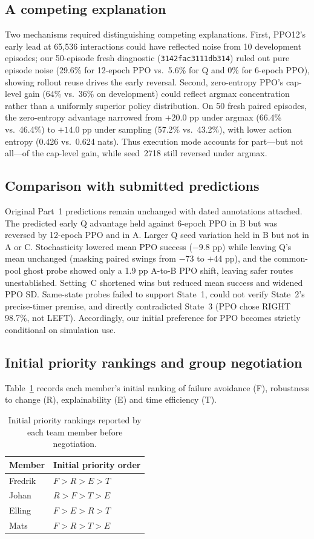 \subsection*{A competing explanation}
Two mechanisms required distinguishing competing explanations. First, PPO12's early lead at
65,536 interactions could have reflected noise from 10 development episodes; our 50-episode
fresh diagnostic (\texttt{3142fac3111db314}) ruled out pure episode noise (29.6\% for 12-epoch
PPO vs.\ 5.6\% for Q and 0\% for 6-epoch PPO), showing rollout reuse drives the early reversal.
Second, zero-entropy PPO's cap-level gain (64\% vs.\ 36\% on development) could reflect argmax
concentration rather than a uniformly superior policy distribution. On 50 fresh paired episodes,
the zero-entropy advantage narrowed from $+20.0$ pp under argmax (66.4\% vs.\ 46.4\%) to
$+14.0$ pp under sampling (57.2\% vs.\ 43.2\%), with lower action entropy (0.426 vs.\ 0.624 nats).
Thus execution mode accounts for part—but not all—of the cap-level gain, while seed~2718 still
reversed under argmax.

\subsection*{Comparison with submitted predictions}
Original Part~1 predictions remain unchanged with dated annotations attached. The predicted early
Q advantage held against 6-epoch PPO in B but was reversed by 12-epoch PPO and in A. Larger Q
seed variation held in B but not in A or C. Stochasticity lowered mean PPO success ($-9.8$ pp)
while leaving Q's mean unchanged (masking paired swings from $-73$ to $+44$ pp), and the common-pool
ghost probe showed only a 1.9 pp A-to-B PPO shift, leaving safer routes unestablished. Setting~C
shortened wins but reduced mean success and widened PPO SD. Same-state probes failed to support
State~1, could not verify State~2's precise-timer premise, and directly contradicted State~3
(PPO chose RIGHT 98.7\%, not LEFT). Accordingly, our initial preference for PPO becomes strictly
conditional on simulation use.

\subsection*{Initial priority rankings and group negotiation}
Table~\ref{tab:priorities} records each member's initial ranking of failure avoidance (F),
robustness to change (R), explainability (E) and time efficiency (T).

\begin{table}[H]\centering\small
\begin{tabular}{ll}\toprule
Member & Initial priority order\\\midrule
Fredrik & $F>R>E>T$\\
Johan   & $R>F>T>E$\\
Elling  & $F>E>R>T$\\
Mats    & $F>R>T>E$\\
\bottomrule\end{tabular}
\caption{Initial priority rankings reported by each team member before negotiation.}
\label{tab:priorities}
\end{table}

